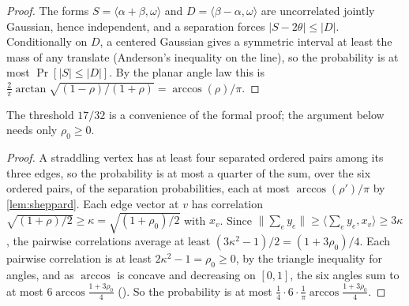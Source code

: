 \documentclass[11pt]{article}
\newcommand{\leanrefs}[1]{{\unskip\nobreak\hfil\penalty50\hskip1em\null\nobreak\hfil
  {\normalfont\small #1}\parfillskip=0pt\finalhyphendemerits=0\par}}
\newcommand{\leanref}[1]{\leanrefs{\lean{#1}}}
\theoremstyle{plain}
\theoremstyle{definition}
\theoremstyle{remark}
\begin{document}

\begin{proof}
The forms $S = \langle\alpha + \beta, \omega\rangle$ and $D = \langle\beta - \alpha,\omega\rangle$ are
uncorrelated jointly Gaussian, hence independent, and a separation forces
$\lvert S - 2\theta\rvert \le \lvert D\rvert$. Conditionally on $D$, a centered Gaussian gives a
symmetric interval at least the mass of any translate (Anderson's inequality on the line), so
the probability is at most $\Pr[\lvert S\rvert \le \lvert D\rvert]$. By the planar angle law this
is $\frac{2}{\pi}\arctan\sqrt{(1-\rho)/(1+\rho)} = \arccos(\rho)/\pi$.
\end{proof}


The threshold $17/32$ is a convenience of the formal proof; the argument below needs only
$\rho_0\ge0$.

\begin{proof}
A straddling vertex has at least four separated ordered pairs among its three edges, so the
probability is at most a quarter of the sum, over the six ordered pairs, of the separation
probabilities, each at most $\arccos(\rho')/\pi$ by \cref{lem:sheppard}. Each edge vector at
$v$ has correlation $\sqrt{(1+\rho)/2} \ge \kappa = \sqrt{(1+\rho_0)/2}$ with $x_v$. Since
$\lVert\sum_e y_e\rVert \ge \langle \sum_e y_e, x_v\rangle \ge 3\kappa$, the pairwise correlations
average at least $(3\kappa^2 - 1)/2 = (1 + 3\rho_0)/4$. Each pairwise correlation is at least
$2\kappa^2 - 1 = \rho_0 \ge 0$, by the triangle inequality for angles, and as $\arccos$ is
concave and decreasing on $[0,1]$, the six angles sum to at most $6\arccos\frac{1+3\rho_0}{4}$
(). So the probability is at most
$\frac14 \cdot 6 \cdot \frac1\pi\arccos\frac{1+3\rho_0}{4}$.
\end{proof}
\end{document}
